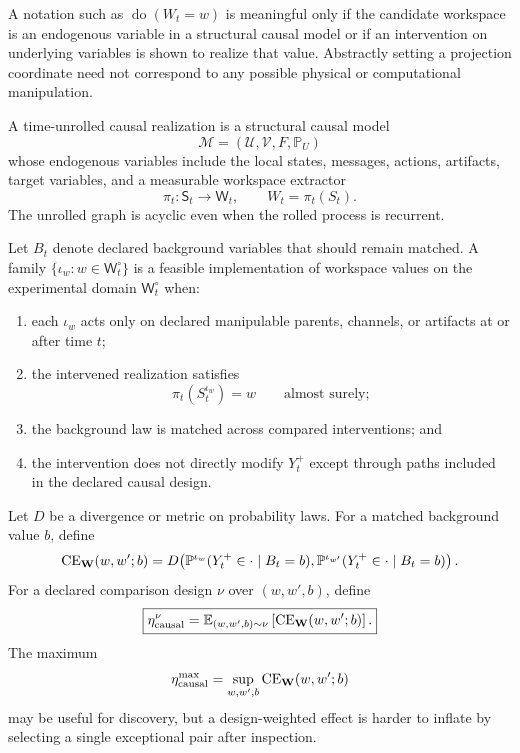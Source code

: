 

A notation such as \(\operatorname{do}(W_t=w)\) is meaningful only if the
candidate workspace is an endogenous variable in a structural causal model or
if an intervention on underlying variables is shown to realize that value.
Abstractly setting a projection coordinate need not correspond to any possible
physical or computational manipulation.

\begin{definition}\label{def:causal-realization}
A time-unrolled causal realization is a structural causal model
\[
\mathcal M
=
(\mathcal U,\mathcal V,F,\mathbb P_U)
\]
whose endogenous variables include the local states, messages, actions,
artifacts, target variables, and a measurable workspace extractor
\[
\pi_t:\mathsf S_t\to\mathsf W_t,
\qquad
W_t=\pi_t(S_t).
\]
The unrolled graph is acyclic even when the rolled process is recurrent.
\end{definition}

\begin{definition}
Let \(B_t\) denote declared background variables that should remain matched.
A family \(\{\iota_w:w\in\mathsf W_t^\circ\}\) is a feasible implementation of
workspace values on the experimental domain \(\mathsf W_t^\circ\) when:
\begin{enumerate}
\item each \(\iota_w\) acts only on declared manipulable parents, channels, or
 artifacts at or after time \(t\);
\item the intervened realization satisfies
\[
\pi_t(S_t^{\iota_w})=w
\qquad\text{almost surely};
\]
\item the background law is matched across compared interventions; and
\item the intervention does not directly modify \(Y_t^+\) except through
 paths included in the declared causal design.
\end{enumerate}
\end{definition}

Let \(D\) be a divergence or metric on probability laws. For a matched
background value \(b\), define
\[
\operatorname{CE}_{\mathbf W}(w,w';b)
=
D\!\left(
\mathbb P^{\iota_w}(Y_t^+\in\cdot\mid B_t=b),
\mathbb P^{\iota_{w'}}(Y_t^+\in\cdot\mid B_t=b)
\right).
\]
For a declared comparison design \(\nu\) over \((w,w',b)\), define
\[
\boxed{
\eta_{\mathrm{causal}}^{\nu}
=
\mathbb E_{(w,w',b)\sim\nu}
\left[
\operatorname{CE}_{\mathbf W}(w,w';b)
\right].
}
\]
The maximum
\[
\eta_{\mathrm{causal}}^{\max}
=
\sup_{w,w',b}\operatorname{CE}_{\mathbf W}(w,w';b)
\]
may be useful for discovery, but a design-weighted effect is harder to inflate
by selecting a single exceptional pair after inspection.

